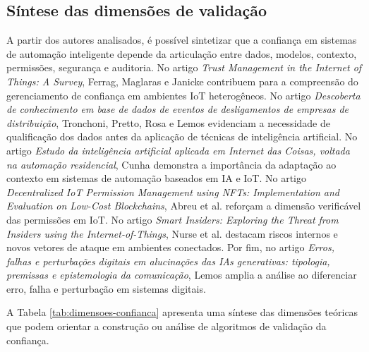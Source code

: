 \documentclass[12pt]{article}
\begin{document}
\subsection{Síntese das dimensões de validação}

A partir dos autores analisados, é possível sintetizar que a confiança em sistemas de automação inteligente depende da articulação entre dados, modelos, contexto, permissões, segurança e auditoria. No artigo \textit{Trust Management in the Internet of Things: A Survey}, Ferrag, Maglaras e Janicke \cite{ferrag2019} contribuem para a compreensão do gerenciamento de confiança em ambientes IoT heterogêneos. No artigo \textit{Descoberta de conhecimento em base de dados de eventos de desligamentos de empresas de distribuição}, Tronchoni, Pretto, Rosa e Lemos \cite{tronchoni2010} evidenciam a necessidade de qualificação dos dados antes da aplicação de técnicas de inteligência artificial. No artigo \textit{Estudo da inteligência artificial aplicada em Internet das Coisas, voltada na automação residencial}, Cunha \cite{cunha2018} demonstra a importância da adaptação ao contexto em sistemas de automação baseados em IA e IoT. No artigo \textit{Decentralized IoT Permission Management using NFTs: Implementation and Evaluation on Low-Cost Blockchains}, Abreu et al. \cite{abreu2025} reforçam a dimensão verificável das permissões em IoT. No artigo \textit{Smart Insiders: Exploring the Threat from Insiders using the Internet-of-Things}, Nurse et al. \cite{nurse2015} destacam riscos internos e novos vetores de ataque em ambientes conectados. Por fim, no artigo \textit{Erros, falhas e perturbações digitais em alucinações das IAs generativas: tipologia, premissas e epistemologia da comunicação}, Lemos \cite{lemos2024} amplia a análise ao diferenciar erro, falha e perturbação em sistemas digitais.

A Tabela \ref{tab:dimensoes-confianca} apresenta uma síntese das dimensões teóricas que podem orientar a construção ou análise de algoritmos de validação da confiança.
\end{document}
